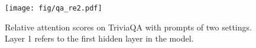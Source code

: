 \begin{figure}[t] %
\centering %
\texttt{[image: fig/qa\_re2.pdf]} 
\caption{Relative attention scores on TriviaQA with prompts of two settings. Layer 1 refers to the first hidden layer in the model.} %
\label{fig/qa_re} %
\end{figure}